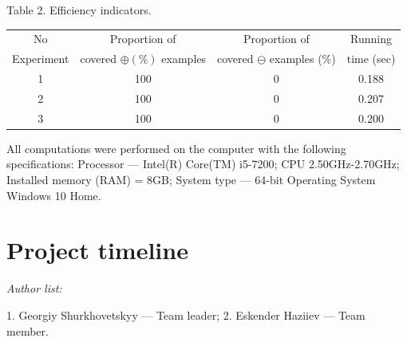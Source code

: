 \documentclass{scrartcl}
\begin{document}
\vspace{6pt}

\begin{tabular}{c}

\end{tabular}

Table 2. Efficiency indicators.

\begin{tabular}{|c|c|c|c|} %
  \hline
 No& Proportion of & Proportion of  & Running\\
Experiment &covered $\oplus (\%) $   examples&covered $\ominus$  examples (\%) &time (sec)\\
  \hline
1& 100 & 0 & 0.188 \\
    \hline
2& 100 & 0 & 0.207  \\
  \hline
3 & 100 & 0 & 0.200   \\
  \hline
 \end{tabular}

 \vspace{6pt}

All computations were performed on the computer with the following specifications:
Processor --- Intel(R) Core(TM) i5-7200; CPU 2.50GHz-2.70GHz;
Installed memory (RAM) = 8GB; System type --- 64-bit Operating System Windows 10 Home.

\section{Project timeline}

\emph{Author list:}

1. Georgiy Shurkhovetskyy --- Team leader; 2. Eskender Haziiev --- Team  member.


\vspace{3pt}
\end{document}
